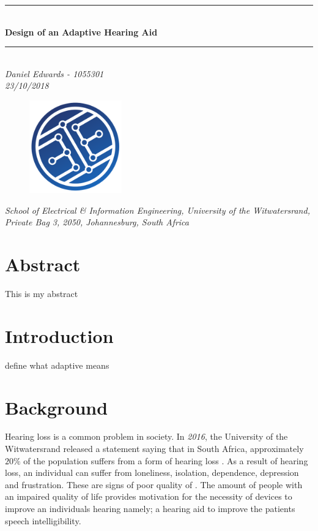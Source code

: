 \documentclass[12pt, onecolumn]{article}
\begin{document}
\begin{titlepage}
\begin{center}   

\vspace{3 cm}


\rule{500pt}{1pt}\\
\vspace{0.5cm}
\textbf{\LARGE Design of an Adaptive Hearing Aid}
\rule{500pt}{1pt}\\
\vspace{1cm}
\textit{Daniel Edwards - 1055301 \\ 23/10/2018}



\begin{figure}[h]
\centering
\includegraphics[width=4cm]{schoolLogo.png}
\end{figure}
\textit{School of Electrical \& Information Engineering, University of the
Witwatersrand, Private Bag 3, 2050, Johannesburg, South Africa}

\end{center}
\end{titlepage}

\tableofcontents
\newpage

\section*{Abstract}

This is my abstract

\section{Introduction}

define what adaptive means

\section{Background}

\noindent Hearing loss is a common problem in society. In \textit{2016}, the University of the Witwatersrand released a statement saying that in South Africa, approximately $20\%$ of the population suffers from a form of hearing loss \cite{witsHearingStats}. As a result of hearing loss, an individual can suffer from loneliness, isolation, dependence, depression and frustration. These are signs of poor quality of \cite{qualityOfLife}. The amount of people with an impaired quality of life provides motivation for the necessity of devices to improve an individuals hearing namely; a hearing aid to improve the patients speech intelligibility. 
\end{document}
